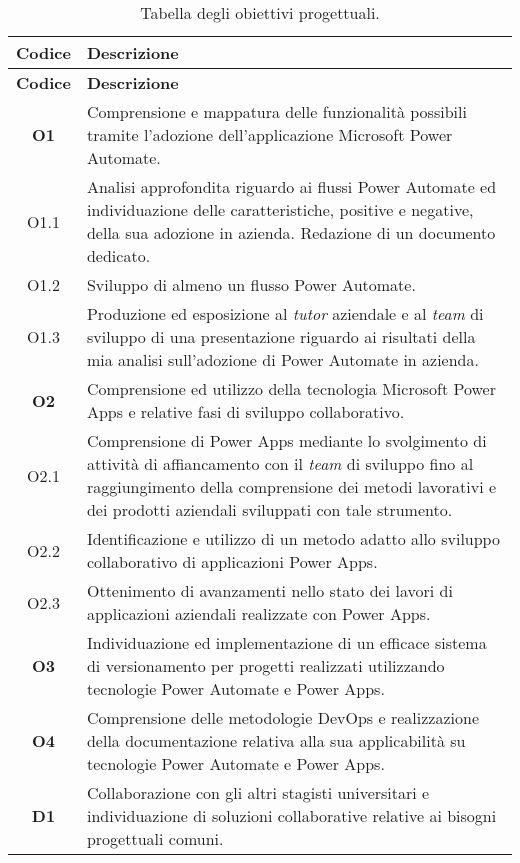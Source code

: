 \begin{longtable}{|c|p{11cm}|}
\caption{Tabella degli obiettivi progettuali.}
\label{tab:obiettiviProgettuali}\\
\hline \textbf{Codice} & \textbf{Descrizione}\\ \hline \endfirsthead
\hline \textbf{Codice} & \textbf{Descrizione}\\ \hline \endhead
\hline \endfoot
\hline \endlastfoot
\textbf{O1}    & Comprensione e mappatura delle funzionalità possibili tramite l'adozione dell'applicazione Microsoft Power Automate.\\
\hline O1.1  & Analisi approfondita riguardo ai flussi Power Automate ed individuazione delle caratteristiche, positive e negative, della sua adozione in azienda. Redazione di un documento dedicato.\\
\hline O1.2  & Sviluppo di almeno un flusso Power Automate.\\
\hline O1.3  & Produzione ed esposizione al \emph{tutor} aziendale e al \emph{team} di sviluppo di una presentazione riguardo ai risultati della mia analisi sull'adozione di Power Automate in azienda.\\
\hline \textbf{O2}  & Comprensione ed utilizzo della tecnologia Microsoft Power Apps e relative fasi di sviluppo collaborativo.\\
\hline O2.1  & Comprensione di Power Apps mediante lo svolgimento di attività di affiancamento con il \emph{team} di sviluppo fino al raggiungimento della comprensione dei metodi lavorativi e dei prodotti aziendali sviluppati con tale strumento.\\
\hline O2.2  & Identificazione e utilizzo di un metodo adatto allo sviluppo collaborativo di applicazioni Power Apps.\\
\hline O2.3  & Ottenimento di avanzamenti nello stato dei lavori di applicazioni aziendali realizzate con Power Apps.\\
\hline \textbf{O3}  & Individuazione ed implementazione di un efficace sistema di versionamento per progetti realizzati utilizzando tecnologie Power Automate e Power Apps.\\
\hline \textbf{O4}  & Comprensione delle metodologie \gls{DevOps} e realizzazione della documentazione relativa alla sua applicabilità su tecnologie Power Automate e Power Apps.\\
\hline 
\hline \textbf{D1}  & Collaborazione con gli altri stagisti universitari e individuazione di soluzioni collaborative relative ai bisogni progettuali comuni.\\

\end{longtable}
